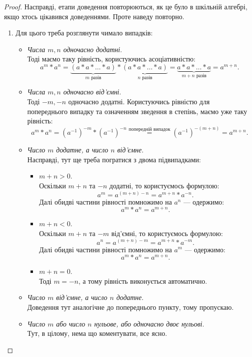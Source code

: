 \documentclass{math_library}
\begin{document}
\begin{proof}
Насправді, етапи доведення повторюються, як це було в шкільній алгебрі, якщо хтось цікавився доведеннями. Проте наведу повторно.
\begin{enumerate}[nosep, wide=0pt, label={\arabic*)}]
\item Для цього треба розглянути чимало випадків:
\begin{itemize}
\item \textit{Числа $m,n$ одночасно додатні}.\\
Тоді маємо таку рівність, користуючись асоціативністю:
\[
a^m * a^n = \underbrace{(a*a*\dots*a)}_{m \text{ разів}} * \underbrace{(a*a*\dots*a)}_{n \text{ разів}} = \underbrace{a*a*\dots*a}_{m+n \text{ разів}} = a^{m+n}.
\]
\item \textit{Числа $m,n$ одночасно від'ємні}.\\
Тоді $-m, -n$ одночасно додатні. Користуючись рівністю для попереднього випадку та означенням зведення в степінь, маємо уже таку рівність:
\[
a^m * a^n = (a^{-1})^{-m} * (a^{-1})^{-n} \overset{\text{попередній випадок}}{=} (a^{-1})^{-(m+n)} = a^{m+n}.
\]
\item \textit{Число $m$ додатне, а число $n$ від'ємне}.\\
Насправді, тут ще треба погратися з двома підвипадками:
\begin{itemize}[label={\#}]
\item $m+n > 0$.\\
Оскільки $m+n$ та $-n$ додатні, то користуємось формулою:
\[
a^{m} = a^{(m+n)-n} = a^{m+n} * a^{-n}.
\]
Далі обидві частини рівності помножимо на $a^n$ --- одержимо:
\[
a^m * a^n = a^{m+n}.
\]
\item $m+n < 0$.\\
Оскільки $m+n$ та $-m$ від'ємні, то користуємось формулою:
\[
a^{n} = a^{(m+n)-m} = a^{m+n} * a^{-m}.
\]
Далі обидві частини рівності помножимо на $a^m$ --- одержимо:
\[
a^m * a^n = a^{m+n}.
\]
\item $m+n = 0$.\\
Тоді $m = -n$, а тому рівність виконується автоматично.
\end{itemize}
\item \textit{Число $m$ від'ємне, а число $n$ додатне}.\\
Доведення тут аналогічне до попереднього пункту, тому пропускаю.
\item \textit{Число $m$ або число $n$ нульове, або одночасно двоє нульові}.\\
Тут, в цілому, нема що коментувати, все ясно.
\end{itemize}


\end{enumerate}
\end{proof}
\end{document}
